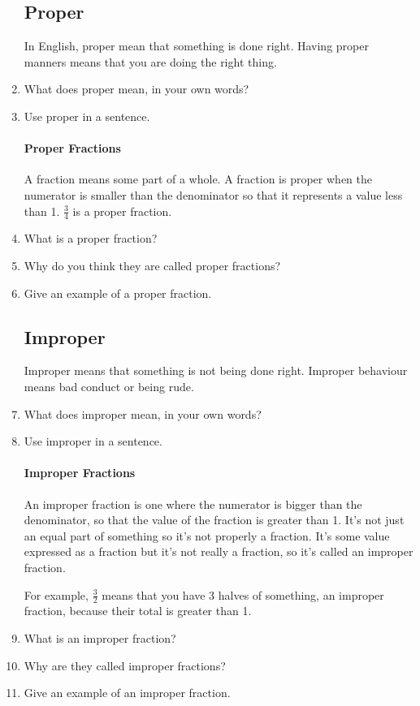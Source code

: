 \documentclass[14pt]{article}
\begin{document}
\begin{enumerate}
\subsection*{Proper} In English, proper mean that something is done right. Having proper manners means that you are doing the right thing.

\item What does proper mean, in your own words?
\item Use proper in a sentence.

\paragraph{Proper Fractions}
A fraction means some part of a whole. A fraction is proper when the numerator is smaller than the denominator so that it represents a value less than 1. $\frac{3}{4}$ is a proper fraction.

\item What is a proper fraction?
\item Why do you think they are called proper fractions?
\item Give an example of a proper fraction.

\newpage

\subsection*{Improper} Improper means that something is not being done right. Improper behaviour means bad conduct or being rude.

\item What does improper mean, in your own words?
\item Use improper in a sentence.

\paragraph{Improper Fractions}
An improper fraction is one where the numerator is bigger than the denominator, so that the value of the fraction is greater than 1. It's not just an equal part of something so it's not properly a fraction. It's some value expressed as a fraction but it's not really a fraction, so it's called an improper fraction.

For example, $\frac{3}{2}$ means that you have 3 halves of something, an improper fraction, because their total is greater than 1.

\item What is an improper fraction?
\item Why are they called improper fractions?
\item Give an example of an improper fraction.


\end{enumerate}
\end{document}
